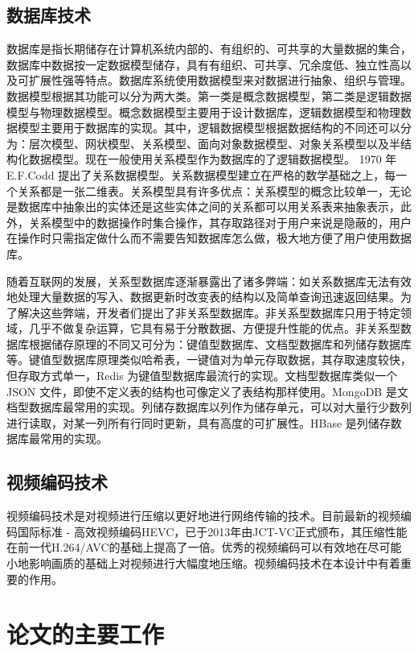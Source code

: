 \subsection{数据库技术}

数据库是指长期储存在计算机系统内部的、有组织的、可共享的大量数据的集合，数据库中数据按一定数据模型储存，具有有组织、可共享、冗余度低、独立性高以及可扩展性强等特点。数据库系统使用数据模型来对数据进行抽象、组织与管理。数据模型根据其功能可以分为两大类。第一类是概念数据模型，第二类是逻辑数据模型与物理数据模型。概念数据模型主要用于设计数据库，逻辑数据模型和物理数据模型主要用于数据库的实现。其中，逻辑数据模型根据数据结构的不同还可以分为：层次模型、网状模型、关系模型、面向对象数据模型、对象关系模型以及半结构化数据模型。现在一般使用关系模型作为数据库的了逻辑数据模型。
1970 年 E.F.Codd 提出了关系数据模型。关系数据模型建立在严格的数学基础之上，每一个关系都是一张二维表。关系模型具有许多优点：关系模型的概念比较单一，无论是数据库中抽象出的实体还是这些实体之间的关系都可以用关系表来抽象表示，此外，关系模型中的数据操作时集合操作，其存取路径对于用户来说是隐蔽的，用户在操作时只需指定做什么而不需要告知数据库怎么做，极大地方便了用户使用数据库。

随着互联网的发展，关系型数据库逐渐暴露出了诸多弊端：如关系数据库无法有效地处理大量数据的写入、数据更新时改变表的结构以及简单查询迅速返回结果。为了解决这些弊端，开发者们提出了非关系型数据库。非关系型数据库只用于特定领域，几乎不做复杂运算，它具有易于分散数据、方便提升性能的优点。非关系型数据库根据储存原理的不同又可分为：键值型数据库、文档型数据库和列储存数据库等。键值型数据库原理类似哈希表，一键值对为单元存取数据，其存取速度较快，但存取方式单一，Redis 为键值型数据库最流行的实现。文档型数据库类似一个 JSON 文件，即使不定义表的结构也可像定义了表结构那样使用。MongoDB 是文档型数据库最常用的实现。列储存数据库以列作为储存单元，可以对大量行少数列进行读取，对某一列所有行同时更新，具有高度的可扩展性。HBase 是列储存数据库最常用的实现。

\subsection{视频编码技术}

视频编码技术是对视频进行压缩以更好地进行网络传输的技术。目前最新的视频编码国际标准 - 高效视频编码HEVC，已于2013年由JCT-VC正式颁布，其压缩性能在前一代H.264/AVC的基础上提高了一倍。优秀的视频编码可以有效地在尽可能小地影响画质的基础上对视频进行大幅度地压缩。视频编码技术在本设计中有着重要的作用。

\section{论文的主要工作}

